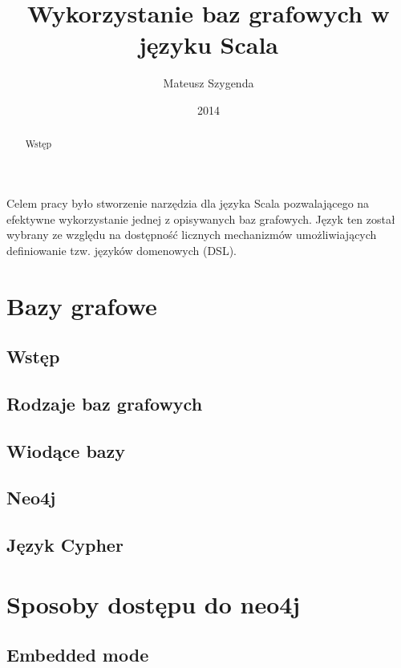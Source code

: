 \documentclass[brudnopis]{xmgr}
\author   {Mateusz Szygenda}
\title    {Wykorzystanie baz grafowych w języku Scala}
\date     {2014}
\begin{document}
\begin{abstract}
Wstęp
\end{abstract}

\maketitle

%
\introduction

Celem pracy było stworzenie narzędzia dla języka Scala pozwalającego na efektywne wykorzystanie jednej z opisywanych baz grafowych. Język ten został wybrany ze względu na dostępność licznych mechanizmów umożliwiających definiowanie tzw. języków domenowych (DSL).

\chapter{Bazy grafowe}

\section{Wstęp}

\section{Rodzaje baz grafowych}

\section{Wiodące bazy}

\section{Neo4j}

\section{Język Cypher}

\chapter{Sposoby dostępu do neo4j}

\section{Embedded mode}
\end{document}
